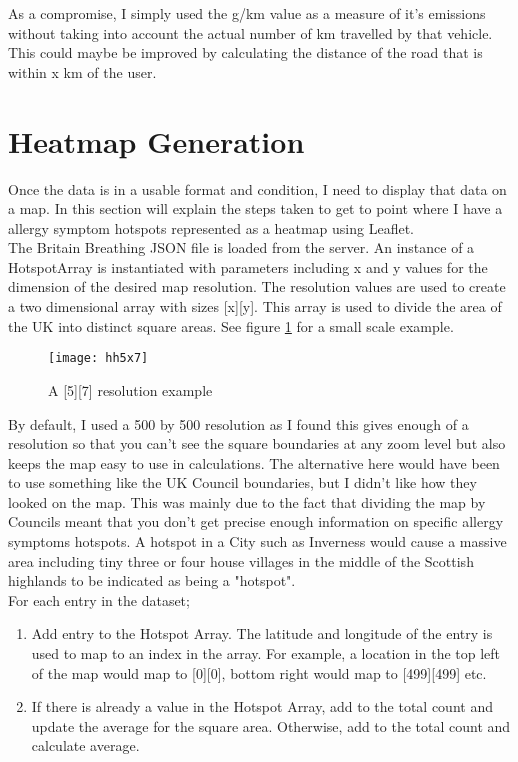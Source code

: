 As a compromise, I simply used the g/km value as a measure of it's emissions without taking into account the actual number of km travelled by that vehicle. This could maybe be improved by calculating the distance of the road that is within x km of the user.

\section{Heatmap Generation}

Once the data is in a usable format and condition, I need to display that data on a map. In this section will explain the steps taken to get to point where I have a allergy symptom hotspots represented as a heatmap using Leaflet.\\

The Britain Breathing JSON file is loaded from the server. An instance of a HotspotArray is instantiated with parameters including x and y values for the dimension of the desired map resolution. The resolution values are used to create a two dimensional array with sizes [x][y]. This array is used to divide the area of the UK into distinct square areas. See figure \ref{fig:hh} for a small scale example.

\begin{figure}[H]
\begin{center}
\texttt{[image: hh5x7]}
\caption{A [5][7] resolution example}
\label{fig:hh}
\end{center}
\end{figure}

By default, I used a 500 by 500 resolution as I found this gives enough of a resolution so that you can't see the square boundaries at any zoom level but also keeps the map easy to use in calculations. The alternative here would have been to use something like the UK Council boundaries, but I didn't like how they looked on the map. This was mainly due to the fact that dividing the map by Councils meant that you don't get precise enough information on specific allergy symptoms hotspots. A hotspot in a City such as Inverness would cause a massive area including tiny three or four house villages in the middle of the Scottish highlands to be indicated as being a "hotspot".\\

For each entry in the dataset;

\begin{enumerate}
    \item Add entry to the Hotspot Array. The latitude and longitude of the entry is used to map to an index in the array. For example, a location in the top left of the map would map to [0][0], bottom right would map to [499][499] etc. 
    \item If there is already a value in the Hotspot Array, add to the total count and update the average for the square area. Otherwise, add to the total count and calculate average.
\end{enumerate}

